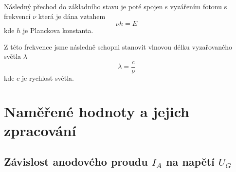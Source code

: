 \documentclass[titlepage]{article}
\begin{document}
Následný přechod do základního stavu je poté spojen s vyzářením fotonu s frekvencí $\nu$ která je dána vztahem
\begin{equation}\label{eq:freq}
 \nu h = E
\end{equation}
kde $h$ je Planckova konstanta.

Z této frekvence jsme následně schopni stanovit vlnovou délku vyzařovaného světla $\lambda$
\begin{equation}\label{eq:wave}
 \lambda = \frac{c}{\nu}
\end{equation}
kde $c$ je rychlost světla.

\newpage
\section{Naměřené hodnoty a jejich zpracování}
\subsection{Závislost anodového proudu $I_A$ na napětí $U_G$}
\end{document}
